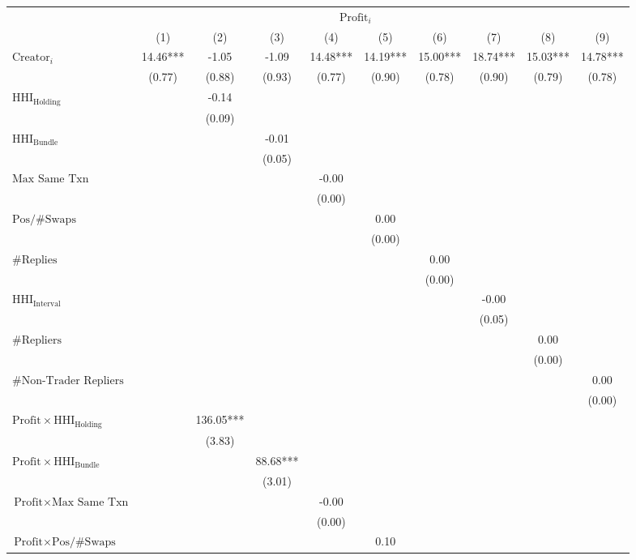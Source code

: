 \begin{tabular}{lccccccccc}
\hline
 & \multicolumn{8}{c}{$\text{Profit}_{i}$} \\ & (1) & (2) & (3) & (4) & (5) & (6) & (7) & (8) & (9)\\
\hline
$\text{Creator}_{i}$& 14.46*** & -1.05 & -1.09 & 14.48*** & 14.19*** & 15.00*** & 18.74*** & 15.03*** & 14.78*** \\
& (0.77) & (0.88) & (0.93) & (0.77) & (0.90) & (0.78) & (0.90) & (0.79) & (0.78) \\
$\text{HHI}_{\text{Holding}}$&  & -0.14 &  &  &  &  &  &  &  \\
&  & (0.09) &  &  &  &  &  &  &  \\
$\text{HHI}_{\text{Bundle}}$&  &  & -0.01 &  &  &  &  &  &  \\
&  &  & (0.05) &  &  &  &  &  &  \\
$\text{Max Same Txn}$&  &  &  & -0.00 &  &  &  &  &  \\
&  &  &  & (0.00) &  &  &  &  &  \\
$\text{Pos/\#Swaps}$&  &  &  &  & 0.00 &  &  &  &  \\
&  &  &  &  & (0.00) &  &  &  &  \\
$\#\text{Replies}$&  &  &  &  &  & 0.00 &  &  &  \\
&  &  &  &  &  & (0.00) &  &  &  \\
$\text{HHI}_{\text{Interval}}$&  &  &  &  &  &  & -0.00 &  &  \\
&  &  &  &  &  &  & (0.05) &  &  \\
$\#\text{Repliers}$&  &  &  &  &  &  &  & 0.00 &  \\
&  &  &  &  &  &  &  & (0.00) &  \\
$\#\text{Non-Trader Repliers}$&  &  &  &  &  &  &  &  & 0.00 \\
&  &  &  &  &  &  &  &  & (0.00) \\
$\text{Profit} \times \text{HHI}_{\text{Holding}}$&  & 136.05*** &  &  &  &  &  &  &  \\
&  & (3.83) &  &  &  &  &  &  &  \\
$\text{Profit} \times \text{HHI}_{\text{Bundle}}$&  &  & 88.68*** &  &  &  &  &  &  \\
&  &  & (3.01) &  &  &  &  &  &  \\
$\text{Profit} \times \text{Max Same Txn}$&  &  &  & -0.00 &  &  &  &  &  \\
&  &  &  & (0.00) &  &  &  &  &  \\
$\text{Profit} \times \text{Pos/\#Swaps}$&  &  &  &  & 0.10 &  &  &  &  \\

\end{tabular}
